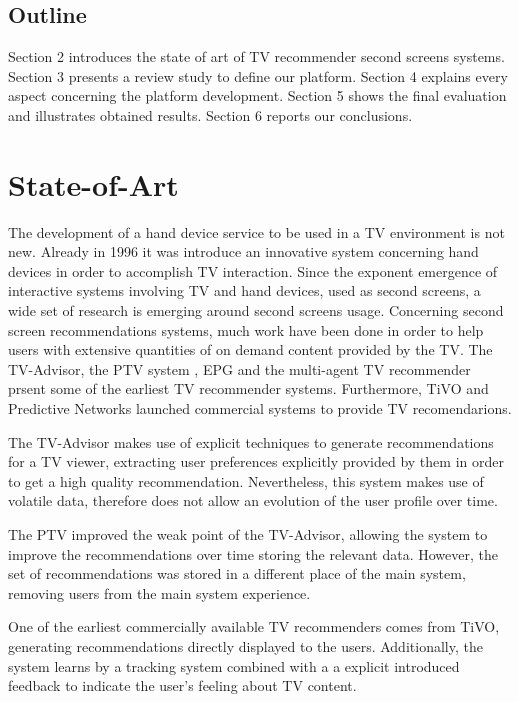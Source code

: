 \documentclass{acm_proc_article-sp}
\begin{document}
\subsection{Outline}

Section 2 introduces the state of art of TV recommender second screens systems. Section 3 presents a review study to define our platform. Section 4 explains every aspect concerning the platform development. Section 5 shows the final evaluation and illustrates obtained results. Section 6 reports our conclusions.

\section{State-of-Art}

The development of a hand device service to be used in a TV environment is not new. Already in 1996\cite{robertson1996dual} it was introduce an innovative system concerning hand devices in order to accomplish TV interaction. Since the exponent emergence of interactive systems involving TV and hand devices, used as second screens, a wide set of research is emerging around second screens usage. Concerning second screen recommendations systems, much work have been done in order to help users with extensive quantities of on demand content provided by the TV. The TV-Advisor\cite{das1998recommender},  the PTV system \cite{cotter2000ptv}, EPG \cite{ardissono2001architecture} and the multi-agent TV recommender\cite{kurapati2001multi} prsent some of the earliest TV recommender systems. Furthermore, TiVO\cite{ali2004tivo} and Predictive Networks\cite{haibe2012predictive} launched commercial systems to provide TV recomendarions. 

The TV-Advisor makes use of explicit techniques to generate recommendations for a TV viewer, extracting user preferences explicitly provided by them in order to get a high quality recommendation. Nevertheless, this system makes use of volatile data, therefore does not allow an evolution of the user profile over time.

The PTV improved the weak point of the TV-Advisor, allowing the system to improve the recommendations over time storing the relevant data. However, the set of recommendations was stored in a different place of the main system, removing users from the main system experience. 

One of the earliest commercially available TV recommenders comes from TiVO, generating recommendations directly displayed to the users. Additionally, the system learns by a tracking system combined with a a explicit introduced feedback to indicate the user's feeling about TV content. 
\end{document}
